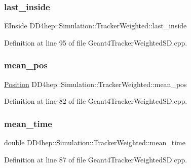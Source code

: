 \subsubsection{\texorpdfstring{last\+\_\+inside}{last\_inside}}
{\footnotesize\ttfamily E\+Inside D\+D4hep\+::\+Simulation\+::\+Tracker\+Weighted\+::last\+\_\+inside}



Definition at line 95 of file Geant4\+Tracker\+Weighted\+S\+D.\+cpp.

\hypertarget{struct_d_d4hep_1_1_simulation_1_1_tracker_weighted_ab378f01fcca56a21b21f3d90c600c984}{}\label{struct_d_d4hep_1_1_simulation_1_1_tracker_weighted_ab378f01fcca56a21b21f3d90c600c984} 
\subsubsection{\texorpdfstring{mean\+\_\+pos}{mean\_pos}}
{\footnotesize\ttfamily \hyperlink{namespace_d_d4hep_1_1_geometry_a55083902099d03506c6db01b80404900}{Position} D\+D4hep\+::\+Simulation\+::\+Tracker\+Weighted\+::mean\+\_\+pos}



Definition at line 82 of file Geant4\+Tracker\+Weighted\+S\+D.\+cpp.

\hypertarget{struct_d_d4hep_1_1_simulation_1_1_tracker_weighted_a222fd48188979006e286b3688452ff6d}{}\label{struct_d_d4hep_1_1_simulation_1_1_tracker_weighted_a222fd48188979006e286b3688452ff6d} 
\subsubsection{\texorpdfstring{mean\+\_\+time}{mean\_time}}
{\footnotesize\ttfamily double D\+D4hep\+::\+Simulation\+::\+Tracker\+Weighted\+::mean\+\_\+time}



Definition at line 87 of file Geant4\+Tracker\+Weighted\+S\+D.\+cpp.

\hypertarget{struct_d_d4hep_1_1_simulation_1_1_tracker_weighted_a8fcddaa426fa0d7a901991856f3f4d1a}{}\label{struct_d_d4hep_1_1_simulation_1_1_tracker_weighted_a8fcddaa426fa0d7a901991856f3f4d1a} 
